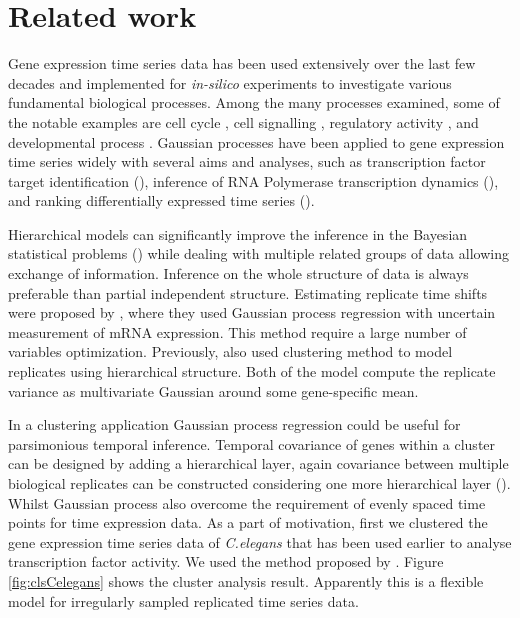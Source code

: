 \section{Related work}
Gene expression time series data has been used extensively over the last few decades and implemented for \textit {in-silico} experiments to investigate various fundamental biological processes. Among the many processes examined, some of the notable examples are cell cycle \cite{Spellman:1998}, cell signalling \cite{Barenco:2006}, regulatory activity \cite{Sanguinetti:2006}, and developmental process \cite{Tomancak:2002}. Gaussian processes have been applied to gene expression time series widely with several aims and analyses, such as transcription factor target identification (\cite{Honkela:2010}), inference of RNA Polymerase transcription dynamics (\cite{Maina:2014}), and ranking differentially expressed time series (\cite{Kalaitzis:2011}).

Hierarchical models can significantly improve the inference in the Bayesian statistical problems (\cite{Gelman:2004}) while dealing with multiple related groups of data allowing exchange of information. Inference on the whole structure of data is always preferable than partial independent structure. Estimating replicate time shifts were proposed by \cite{Liu:2010}, where they used Gaussian process regression with uncertain measurement of mRNA expression. This method require a large number of variables optimization. Previously, \cite{Ng:2006} also \cite{Medvedovic:2004} used clustering method to model replicates using hierarchical structure. Both of the model compute the replicate variance as multivariate Gaussian around some gene-specific mean.

In a clustering application Gaussian process regression could be useful for parsimonious temporal inference. Temporal covariance of genes within a cluster can be designed by adding a hierarchical layer, again covariance between multiple biological replicates can be constructed considering one more hierarchical layer (\cite{Menzefricke:2000, Hensman:2013}). Whilst Gaussian process also overcome the requirement of evenly spaced time points for time expression data. As a part of motivation, first we clustered the gene expression time series data of \textit{C.elegans} that has been used earlier to analyse transcription factor activity. We used the method proposed by \cite{Hensman:2013}. Figure \ref{fig:clsCelegans} shows the cluster analysis result. Apparently this is a flexible model for irregularly sampled replicated time series data.

